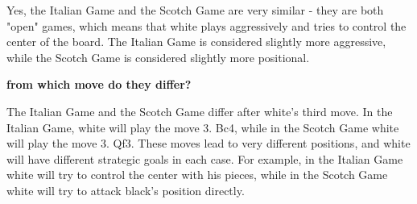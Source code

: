 \documentclass[11pt]{article}
\begin{document}
\begin{framed}
\begin{minipage}{.9\textwidth}
\vspace{1em}

Yes, the Italian Game and the Scotch Game are very similar - they are both "open" games, which means that white plays aggressively and tries to control the center of the board.  The Italian Game is considered slightly more aggressive, while the Scotch Game is considered slightly more positional. 
\vspace{1em}

\textbf{from which move do they differ?}

\vspace{1em}


The Italian Game and the Scotch Game differ after white's third move.  In the Italian Game, white will play the move 3. Bc4, while in the Scotch Game white will play the move 3. Qf3.  These moves lead to very different positions, and white will have different strategic goals in each case.  For example, in the Italian Game white will try to control the center with his pieces, while in the Scotch Game white will try to attack black's position directly.
\end{minipage}
\vspace{.5em}
\end{framed}
\end{document}
